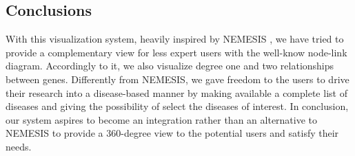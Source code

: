 \documentclass[12pt,twocolumn,twoside]{article}
\begin{document}
	\subsection*{Conclusions}
	With this visualization system, heavily inspired by NEMESIS \cite{ivapp19}, we have tried to provide a complementary view for less expert users with the well-know node-link diagram. Accordingly to it, we also visualize degree one and two relationships between genes. Differently from NEMESIS, we gave freedom to the users to drive their research into a disease-based manner by making available a complete list of diseases and giving the possibility of select the diseases of interest. In conclusion, our system aspires to become an integration rather than an alternative to NEMESIS to provide a 360-degree view to the potential users and satisfy their needs.
	\clearpage
	
	 
	
\end{document}
